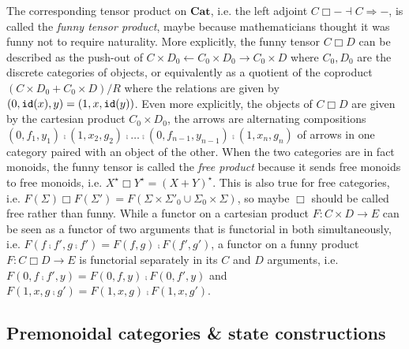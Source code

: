The corresponding tensor product on $\mathbf{Cat}$, i.e. the left adjoint $C \Box - \dashv C \Rightarrow -$, is called the \emph{funny tensor product}, maybe because mathematicians thought it was funny not to require naturality.
More explicitly, the funny tensor $C \Box D$ can be described as the push-out of $C \times D_0 \leftarrow C_0 \times D_0 \to C_0 \times D$ where $C_0, D_0$ are the discrete categories of objects, or equivalently as a quotient of the coproduct $(C \times D_0 + C_0 \times D) / R$ where the relations are given by $(0, \mathtt{id}(x), y) = (1, x, \mathtt{id}(y))$.
Even more explicitly, the objects of $C \Box D$ are given by the cartesian product $C_0 \times D_0$, the arrows are alternating compositions $(0, f_1, y_1) \fcmp (1, x_2, g_2) \fcmp \dots \fcmp (0, f_{n - 1}, y_{n -1}) \fcmp (1, x_n, g_n)$ of arrows in one category paired with an object of the other.
When the two categories are in fact monoids, the funny tensor is called the \emph{free product} because it sends free monoids to free monoids, i.e. $X^\star \Box Y^\star = (X + Y)^\star$.
This is also true for free categories, i.e. $F(\Sigma) \Box F(\Sigma') = F(\Sigma \times \Sigma'_0 \cup \Sigma_0 \times \Sigma)$, so maybe $\Box$ should be called free rather than funny.
While a functor on a cartesian product $F : C \times D \to E$ can be seen as a functor of two arguments that is functorial in both simultaneously, i.e. $F(f \fcmp f', g \fcmp f') = F(f, g) \fcmp F(f', g')$, a functor on a funny product $F : C \Box D \to E$ is functorial separately in its $C$ and $D$ arguments, i.e. $F(0, f \fcmp f', y) = F(0, f, y) \fcmp F(0, f', y)$ and $F(1, x, g \fcmp g') = F(1, x, g) \fcmp F(1, x, g')$.

\subsection{Premonoidal categories \& state constructions}\label{subsection:state-construction}

